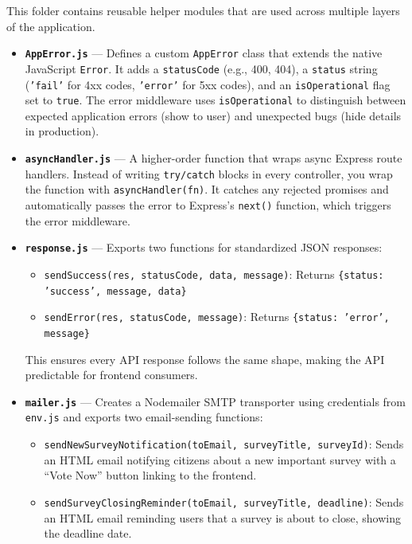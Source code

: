 \documentclass[12pt,a4paper]{article}
\begin{document}
This folder contains reusable helper modules that are used across multiple layers of the application.

\begin{itemize}[leftmargin=1cm]
  \item \textbf{\texttt{AppError.js}} --- Defines a custom \texttt{AppError} class that extends the native JavaScript \texttt{Error}. It adds a \texttt{statusCode} (e.g., 400, 404), a \texttt{status} string (\texttt{'fail'} for 4xx codes, \texttt{'error'} for 5xx codes), and an \texttt{isOperational} flag set to \texttt{true}. The error middleware uses \texttt{isOperational} to distinguish between expected application errors (show to user) and unexpected bugs (hide details in production).

  \item \textbf{\texttt{asyncHandler.js}} --- A higher-order function that wraps async Express route handlers. Instead of writing \texttt{try/catch} blocks in every controller, you wrap the function with \texttt{asyncHandler(fn)}. It catches any rejected promises and automatically passes the error to Express's \texttt{next()} function, which triggers the error middleware.

  \item \textbf{\texttt{response.js}} --- Exports two functions for standardized JSON responses:
  \begin{itemize}
    \item \texttt{sendSuccess(res, statusCode, data, message)}: Returns \texttt{\{status: 'success', message, data\}}
    \item \texttt{sendError(res, statusCode, message)}: Returns \texttt{\{status: 'error', message\}}
  \end{itemize}
  This ensures every API response follows the same shape, making the API predictable for frontend consumers.

  \item \textbf{\texttt{mailer.js}} --- Creates a Nodemailer SMTP transporter using credentials from \texttt{env.js} and exports two email-sending functions:
  \begin{itemize}
    \item \texttt{sendNewSurveyNotification(toEmail, surveyTitle, surveyId)}: Sends an HTML email notifying citizens about a new important survey with a ``Vote Now'' button linking to the frontend.
    \item \texttt{sendSurveyClosingReminder(toEmail, surveyTitle, deadline)}: Sends an HTML email reminding users that a survey is about to close, showing the deadline date.
  \end{itemize}
\end{itemize}
\end{document}
